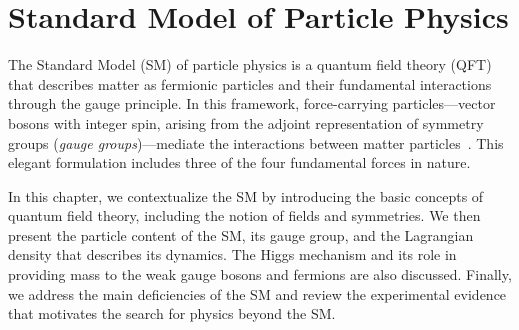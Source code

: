 \chapter{Standard Model of Particle Physics}\label{ch:sm}

The Standard Model (SM) of particle physics is a quantum field theory (QFT) that describes matter as fermionic particles and their fundamental interactions through the gauge principle. In this framework, force-carrying particles---vector bosons with integer spin, arising from the adjoint representation of symmetry groups (\textit{gauge groups})---mediate the interactions between matter particles~\parencite{greiner2000relativistic,pokorski2000gauge}. This elegant formulation includes three of the four fundamental forces in nature.

In this chapter, we contextualize the SM by introducing the basic concepts of quantum field theory, including the notion of fields and symmetries. We then present the particle content of the SM, its gauge group, and the Lagrangian density that describes its dynamics. The Higgs mechanism and its role in providing mass to the weak gauge bosons and fermions are also discussed. Finally, we address the main deficiencies of the SM and review the experimental evidence that motivates the search for physics beyond the SM.

